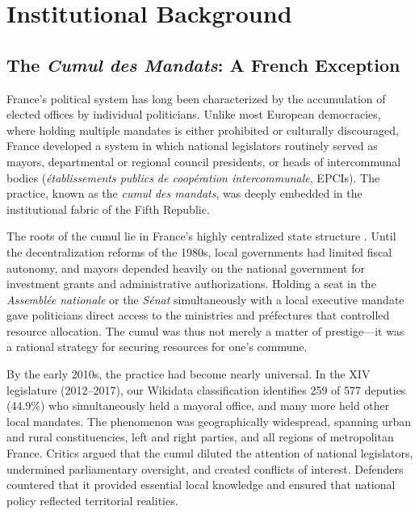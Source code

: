 \documentclass[12pt]{article}
\begin{document}
\section{Institutional Background}\label{sec:background}

\subsection{The \textit{Cumul des Mandats}: A French Exception}

France's political system has long been characterized by the accumulation of elected offices by individual politicians. Unlike most European democracies, where holding multiple mandates is either prohibited or culturally discouraged, France developed a system in which national legislators routinely served as mayors, departmental or regional council presidents, or heads of intercommunal bodies (\textit{établissements publics de coopération intercommunale}, EPCIs). The practice, known as the \textit{cumul des mandats}, was deeply embedded in the institutional fabric of the Fifth Republic.

The roots of the cumul lie in France's highly centralized state structure \citep{solediaz2013cumul}. Until the decentralization reforms of the 1980s, local governments had limited fiscal autonomy, and mayors depended heavily on the national government for investment grants and administrative authorizations. Holding a seat in the \textit{Assemblée nationale} or the \textit{Sénat} simultaneously with a local executive mandate gave politicians direct access to the ministries and préfectures that controlled resource allocation. The cumul was thus not merely a matter of prestige---it was a rational strategy for securing resources for one's commune.

By the early 2010s, the practice had become nearly universal. In the XIV legislature (2012--2017), our Wikidata classification identifies 259 of 577 deputies (44.9\%) who simultaneously held a mayoral office, and many more held other local mandates. The phenomenon was geographically widespread, spanning urban and rural constituencies, left and right parties, and all regions of metropolitan France. Critics argued that the cumul diluted the attention of national legislators, undermined parliamentary oversight, and created conflicts of interest. Defenders countered that it provided essential local knowledge and ensured that national policy reflected territorial realities.
\end{document}
